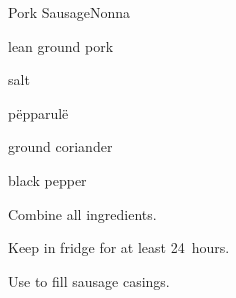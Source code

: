 \begin{recipe}{Pork Sausage}{Nonna}{}

\begin{ingredients}
\item lean ground pork
\item salt
\item p\"epparul\"e
\item ground coriander
\item black pepper
\end{ingredients}

\begin{directions}
\item Combine all ingredients.
\item Keep in fridge for at least 24~hours.
\item Use to fill sausage casings.
\end{directions}

\end{recipe}
